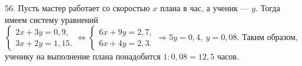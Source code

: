56. Пусть мастер работает со скоростью $x$ плана в час, а ученик --- $y.$ Тогда имеем систему уравнений
$\begin{cases}2x+3y=0,9,\\ 3x+2y=1,15.\end{cases}\Leftrightarrow
\begin{cases}6x+9y=2,7,\\ 6x+4y=2,3.\end{cases}\Rightarrow 5y=0,4,\ y=0,08.$ Таким образом, ученику на выполнение плана понадобится $1:0,08=12,5$ часов.\\
